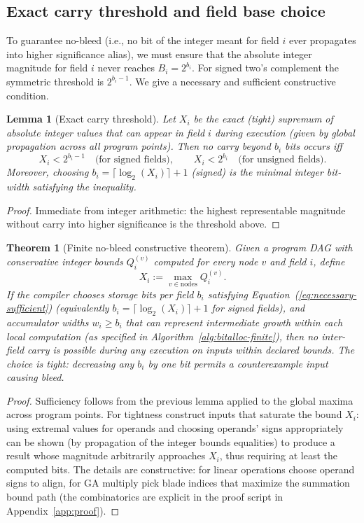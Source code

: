 \documentclass[11pt]{article}
\theoremstyle{definition}
\theoremstyle{plain}
\newtheorem{theorem}{Theorem}[section]
\newtheorem{lemma}{Lemma}[section]
\begin{document}
\subsection{Exact carry threshold and field base choice}
To guarantee no-bleed (i.e., no bit of the integer meant for field $i$ ever propagates into higher significance alias), we must ensure that the absolute integer magnitude for field $i$ never reaches $B_i=2^{b_i}$. For signed two's complement the symmetric threshold is $2^{b_i-1}$. We give a necessary and sufficient constructive condition.

\begin{lemma}[Exact carry threshold]
Let $X_i$ be the exact (tight) supremum of absolute integer values that can appear in field $i$ during execution (given by global propagation across all program points). Then no carry beyond $b_i$ bits occurs iff
\begin{equation}\label{eq:necessary-sufficient}
X_i < 2^{b_i-1}\quad\text{(for signed fields)},\qquad X_i < 2^{b_i}\quad\text{(for unsigned fields)}.
\end{equation}
Moreover, choosing $b_i = \lceil \log_2(X_i) \rceil + 1$ (signed) is the minimal integer bit-width satisfying the inequality.
\end{lemma}

\begin{proof}
Immediate from integer arithmetic: the highest representable magnitude without carry into higher significance is the threshold above.
\end{proof}

\begin{theorem}[Finite no-bleed constructive theorem]
\label{thm:finite-nobleed}
Given a program DAG with conservative integer bounds $Q^{(v)}_i$ computed for every node $v$ and field $i$, define
$$
X_i := \max_{v\in\mathrm{nodes}} Q^{(v)}_i.
$$
If the compiler chooses storage bits per field $b_i$ satisfying Equation~(\ref{eq:necessary-sufficient}) (equivalently $b_i = \lceil \log_2(X_i) \rceil + 1$ for signed fields), and accumulator widths $w_i\ge b_i$ that can represent intermediate growth within each local computation (as specified in Algorithm~\ref{alg:bitalloc-finite}), then no inter-field carry is possible during any execution on inputs within declared bounds. The choice is tight: decreasing any $b_i$ by one bit permits a counterexample input causing bleed.
\end{theorem}

\begin{proof}
Sufficiency follows from the previous lemma applied to the global maxima across program points. For tightness construct inputs that saturate the bound $X_i$: using extremal values for operands and choosing operands' signs appropriately can be shown (by propagation of the integer bounds equalities) to produce a result whose magnitude arbitrarily approaches $X_i$, thus requiring at least the computed bits. The details are constructive: for linear operations choose operand signs to align, for GA multiply pick blade indices that maximize the summation bound path (the combinatorics are explicit in the proof script in Appendix~\ref{app:proof}).
\end{proof}
\end{document}
